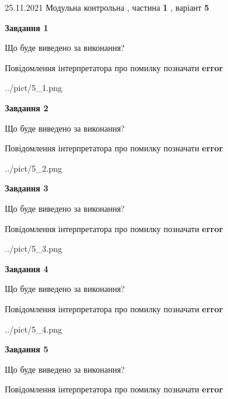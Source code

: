 \documentclass[10pt, ukrainian]{article}
\begin{document}
{25.11.2021 Модульна контрольна , частина \textbf { 1 }, варіант  \No \textbf { 5 }\par}
{
\begin {large}

{\begin {center}\textbf{Завдання 1}\end {center}}\par
Що буде виведено за виконання? \par
Повідомлення інтерпретатора про помилку позначати \textbf{error}

\begin{center}
	{../pict/5_1.png}
\end{center}
\newpage

{\begin {center}\textbf{Завдання 2}\end {center}}\par
Що буде виведено за виконання? \par
Повідомлення інтерпретатора про помилку позначати \textbf{error}

\begin{center}
	{../pict/5_2.png}
\end{center}
\newpage

{\begin {center}\textbf{Завдання 3}\end {center}}\par
Що буде виведено за виконання? \par
Повідомлення інтерпретатора про помилку позначати \textbf{error}

\begin{center}
	{../pict/5_3.png}
\end{center}
\newpage

{\begin {center}\textbf{Завдання 4}\end {center}}\par
Що буде виведено за виконання? \par
Повідомлення інтерпретатора про помилку позначати \textbf{error}

\begin{center}
	{../pict/5_4.png}
\end{center}
\newpage

{\begin {center}\textbf{Завдання 5}\end {center}}\par
Що буде виведено за виконання? \par
Повідомлення інтерпретатора про помилку позначати \textbf{error}


\end{large}}
\end{document}
